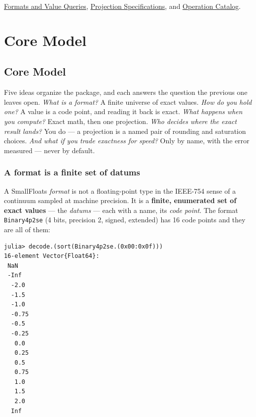 \label{292862844209942199}{}


\href{reference\_\allowbreak{}formats\_\allowbreak{}values.md}{Formats and Value Queries}, \href{reference\_\allowbreak{}projections.md}{Projection Specifications}, and \href{reference\_\allowbreak{}operations.md}{Operation Catalog}.



\chapter{Core Model}


\section{Core Model}



\label{4292203272697199513}{}


Five ideas organize the package, and each answers the question the previous one leaves open. \emph{What is a format?} A finite universe of exact values. \emph{How do you hold one?} A value is a code point, and reading it back is exact. \emph{What happens when you compute?} Exact math, then one projection. \emph{Who decides where the exact result lands?} You do — a projection is a named pair of rounding and saturation choices. \emph{And what if you trade exactness for speed?} Only by name, with the error measured — never by default.



\subsection{A format is a finite set of datums}



\label{5472462564696178089}{}


A SmallFloats \emph{format} is not a floating-point type in the IEEE-754 sense of a continuum sampled at machine precision. It is a \textbf{finite, enumerated set of exact values} — the \emph{datums} — each with a name, its \emph{code point}. The format \texttt{Binary4p2se} (4 bits, precision 2, signed, extended) has 16 code points and they are all of them:




\nopagebreak[4]
\begin{verbatim}
julia> decode.(sort(Binary4p2se.(0x00:0x0f)))
16-element Vector{Float64}:
 NaN
 -Inf
  -2.0
  -1.5
  -1.0
  -0.75
  -0.5
  -0.25
   0.0
   0.25
   0.5
   0.75
   1.0
   1.5
   2.0
  Inf
\end{verbatim}



